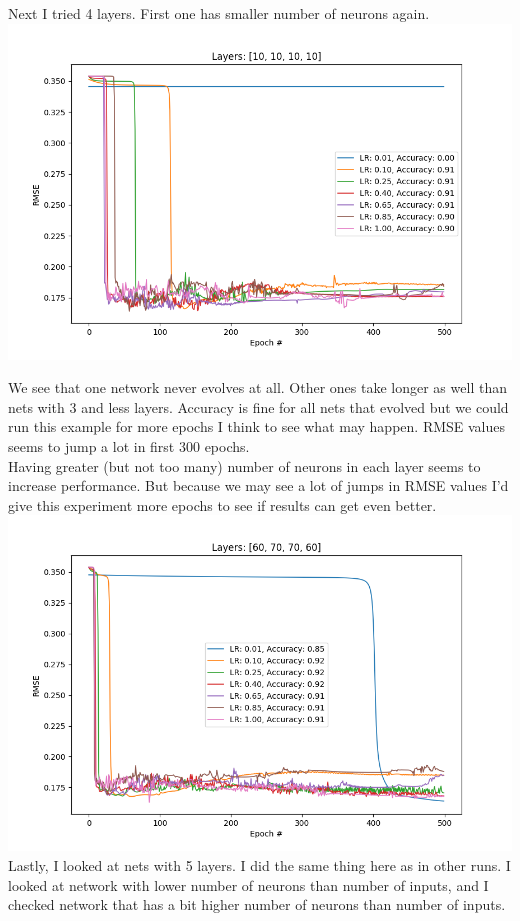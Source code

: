 \documentclass[12pt, letterpaper]{article}
\begin{document}
\begin{enumerate}[label=\Roman*.]
	   Next I tried 4 layers. First one has smaller number of neurons again.
	   {\center \includegraphics[scale=0.7]{../images/rmse_8.png} \\}
	     
	   We see that one network never evolves at all. Other ones take longer as well than nets with 3 and less layers. Accuracy is fine for all nets that evolved but we could run this example for more epochs I think to see what may happen. RMSE values seems to jump a lot in first 300 epochs.\\
	     
	   Having greater (but not too many) number of neurons in each layer seems to increase performance. But because we may see a lot of jumps in RMSE values I'd give this experiment more epochs to see if results can get even better. \\
	   {\center \includegraphics[scale=0.7]{../images/rmse_9.png} \\}
	   Lastly, I looked at nets with 5 layers. I did the same thing here as in other runs. I looked at network with lower number of neurons than number of inputs, and I checked network that has a bit higher number of neurons than number of inputs.
	      

\end{enumerate}
\end{document}
